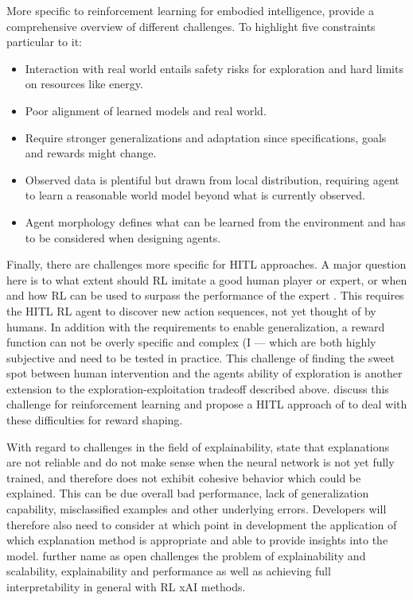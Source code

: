 \documentclass[twoside,11pt]{article}
\begin{document}
\begin{enumerate}
More specific to reinforcement learning for embodied intelligence, \citet{RoyEtAl:2021:RLRoboticsChallenges} provide a comprehensive overview of different challenges. To highlight five constraints particular to it:
\begin{itemize}
    \item Interaction with real world entails safety risks for exploration and hard limits on resources like energy.
    \item Poor alignment of learned models and real world.
    \item Require stronger generalizations  and adaptation since specifications, goals and rewards might change.
    \item Observed data is plentiful but drawn from local distribution, requiring agent to learn a reasonable world model beyond  what is currently observed. 
    \item Agent morphology defines what can be learned from the environment and has to be considered when designing agents.
\end{itemize}

Finally, there are challenges more specific for HITL approaches. A major question here is to what extent should RL imitate a good human player or expert, or when and how RL can be used to surpass the performance of the expert \citep{Abel:2017:AgentAgnosticHumanInTheLoopRL}. This requires the HITL RL agent to discover new action sequences, not yet thought of by humans. In addition with the requirements to enable generalization, a reward function can not be overly specific and complex (\citep{LiuAbbeel:2020:UnsupervisedActivePreTraining}I --- which are both highly subjective and need to be tested in practice. This challenge of finding the sweet spot between human intervention and the agents ability of exploration is another extension to the exploration-exploitation tradeoff described above. \citet{LeeSmithAbbeel:2021:FeedbackPreferenceHITLLearningPEBBLE} discuss this challenge for reinforcement learning and propose a HITL approach of to deal with these difficulties for reward shaping.

With regard to challenges in the field of explainability, \citet{GlanoisEtAl:2021:SurveyInterpretableRL} state that explanations are not reliable and do not make sense when the neural network is not yet fully trained, and therefore does not exhibit cohesive behavior which could be explained. This can be due overall bad performance, lack of generalization capability, misclassified examples and other underlying errors. Developers will therefore also need to consider at which point in development the application of which explanation method is appropriate and able to provide insights into the model. \citet{GlanoisEtAl:2021:SurveyInterpretableRL} further name as open challenges the problem of explainability and scalability, explainability and performance as well as achieving full interpretability in general with RL xAI methods.


\end{enumerate}
\end{document}
